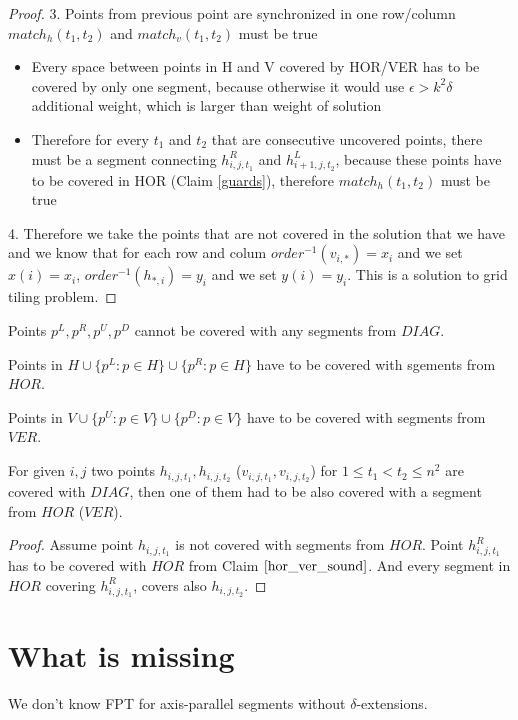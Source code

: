 \begin{proof}
3. Points from previous point are synchronized in one row/column
$match_h(t_1,t_2)$ and $match_v(t_1,t_2)$ must be true
\begin{itemize}
\item Every space between points in H and V covered by HOR/VER
has to be covered by only one segment, because otherwise it would
use $\epsilon > k^2\delta$ additional weight, which is larger than
weight of solution
\item Therefore for every $t_1$ and $t_2$ that are consecutive
uncovered points, there must be a segment connecting
$h^R_{i,j,t_1}$ and $h^L_{i+1,j,t_2}$, because these points
have to be covered in HOR (Claim \ref{guards}),
therefore $match_h(t_1,t_2)$ must be true
\end{itemize}

4. Therefore we take the points that are not covered in the solution
that we have and we know that for each row and colum
$order^{-1}(v_{i,*}) = x_i$ and we set $x(i) = x_i$,
$order^{-1}(h_{*,i}) = y_i$ and we set $y(i) = y_i$.
This is a solution to grid tiling problem.

\end{proof}

\begin{claim}
\label{guards}
Points $p^{L}, p^R, p^U, p^D$ cannot be covered with
any segments from $DIAG$.
\end{claim}


\begin{claim}
\label{hor_ver_sound}
Points in $H \cup \{p^L : p \in H\} \cup \{p^R : p \in H\}$
have to be covered with sgements from $HOR$.

Points in $V \cup \{p^U : p \in V\} \cup \{p^D : p \in V\} $
have to be covered with segments from $VER$.
\end{claim}


\begin{claim}
\label{one_diag_in_square}
For given $i, j$ two points $h_{i, j, t_1}, h_{i, j, t_2}$
($v_{i, j, t_1}, v_{i, j, t_2}$)
for $1 \le t_1 < t_2 \le n^2$ are covered with $DIAG$,
then one of them had to be also covered with a segment from $HOR$
($VER$).
\end{claim}

\begin{proof}
Assume point $h_{i, j, t_1}$ is not covered with
segments from $HOR$.
Point $h^R_{i, j, t_1}$ has to be covered with $HOR$
from Claim $\ref{hor_ver_sound}$.
And every segment in $HOR$ covering $h^R_{i, j, t_1}$,
covers also $h_{i, j, t_2}$.
\end{proof}


\section{What is missing}
We don't know FPT for axis-parallel segments without $\delta$-extensions.
